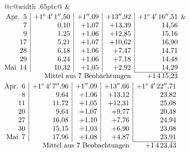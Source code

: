 \noindent\begin{tabular}{@{}c@{\hspace{.4em}\vrule width .65pt\hspace{.4em}}c@{}}
 &
 \\[.18ex]
\(\begin{array}[t]{@{}r|r|r|r|r@{}}
\text{Apr.}\enspace 5 & +1^\circ\,4'\,1''{,}50 & +1''{,}09 & +13''{,}92 & +1^\circ\,4'\,16''{,}51\\
7 & 0{,}10 & +1{,}07 & +13{,}39 & 14{,}56\\
9 & 1{,}25 & +1{,}06 & +12{,}85 & 15{,}16\\
17 & 5{,}21 & +1{,}07 & +10{,}62 & 16{,}90\\
28 & 6{,}18 & +1{,}06 & +7{,}47 & 14{,}71\\
29 & 6{,}24 & +1{,}06 & +7{,}18 & 14{,}48\\
\text{Mai}\enspace 14 & 10{,}32 & +1{,}05 & +2{,}92 & 14{,}29\\
\cline{5-5}
\multicolumn{4}{r}{\text{Mittel aus 7 Beobachtungen}} & +1\,4\,15{,}23
\end{array}\)
&
\(\begin{array}[t]{@{}r|r|r|r|r@{}}
\text{Apr.}\enspace 6 & +1^\circ\,4'\,7''{,}96 & +1''{,}09 & +13''{,}66 & +1^\circ\,4'\,22''{,}71\\
8 & 9{,}64 & +1{,}06 & +13{,}12 & 23{,}82\\
11 & 11{,}72 & +1{,}05 & +12{,}31 & 25{,}08\\
20 & 9{,}64 & +1{,}07 & +9{,}77 & 20{,}48\\
27 & 16{,}08 & +1{,}10 & +7{,}76 & 24{,}94\\
30 & 15{,}15 & +1{,}03 & +6{,}90 & 23{,}08\\
\text{Mai}\enspace 7 & 17{,}96 & +1{,}08 & +4{,}87 & 23{,}91\\
\cline{5-5}
\multicolumn{4}{r}{\text{Mittel aus 7 Beobachtungen}} & +1\,4\,23{,}43
\end{array}\)
\end{tabular}\par\medskip

\par\clearpage
\noindent\makebox[12mm][l]{}\par\medskip


